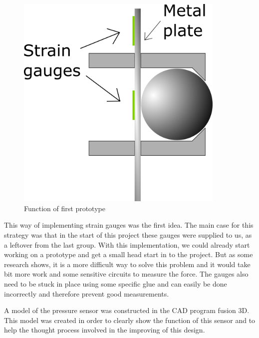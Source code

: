\begin{figure}[H]%
\begin{center}
	\includegraphics[width = 10cm]{Figures/Press_sens_func_1.png}
	\caption{Function of first prototype}
	\label{Press_sens_prot_1}
\end{center}
\end{figure}

This way of implementing strain gauges was the first idea. 
The main case for this strategy was that in the start of this project these gauges were supplied to us, as a leftover from the last group. With this implementation, we could already start working on a prototype and get a small head start in to the project. But as some research shows, it is a more difficult way to solve this problem and it would take bit more work and some sensitive circuits to measure the force. The gauges also need to be stuck in place using some specific glue and can easily be done incorrectly and therefore prevent good measurements.

A model of the pressure sensor was constructed in the CAD program fusion 3D. This model was created in order to clearly show the function of this sensor and to help the thought process involved in the improving of this design.

